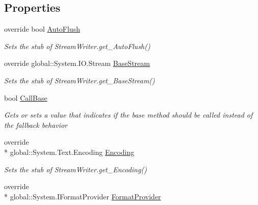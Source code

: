 \subsection*{Properties}
\begin{DoxyCompactItemize}
\item 
override bool \hyperlink{class_system_1_1_i_o_1_1_fakes_1_1_stub_stream_writer_aa41a13ea97c2fb374fc1fd820a104561}{Auto\-Flush}
\begin{DoxyCompactList}\small\item\em Sets the stub of Stream\-Writer.\-get\-\_\-\-Auto\-Flush()\end{DoxyCompactList}\item 
override global\-::\-System.\-I\-O.\-Stream \hyperlink{class_system_1_1_i_o_1_1_fakes_1_1_stub_stream_writer_a62a63cf4cc7520e56be690213aa04c3b}{Base\-Stream}
\begin{DoxyCompactList}\small\item\em Sets the stub of Stream\-Writer.\-get\-\_\-\-Base\-Stream()\end{DoxyCompactList}\item 
bool \hyperlink{class_system_1_1_i_o_1_1_fakes_1_1_stub_stream_writer_a147172eb2eaab54a5fd8c13972f4abfd}{Call\-Base}
\begin{DoxyCompactList}\small\item\em Gets or sets a value that indicates if the base method should be called instead of the fallback behavior\end{DoxyCompactList}\item 
override \\*
global\-::\-System.\-Text.\-Encoding \hyperlink{class_system_1_1_i_o_1_1_fakes_1_1_stub_stream_writer_a68af4697f23bea227622c18a8570f7cc}{Encoding}
\begin{DoxyCompactList}\small\item\em Sets the stub of Stream\-Writer.\-get\-\_\-\-Encoding()\end{DoxyCompactList}\item 
override \\*
global\-::\-System.\-I\-Format\-Provider \hyperlink{class_system_1_1_i_o_1_1_fakes_1_1_stub_stream_writer_a4f224bef2d01adfd14fd75c3ff5d523f}{Format\-Provider}

\end{DoxyCompactItemize}
